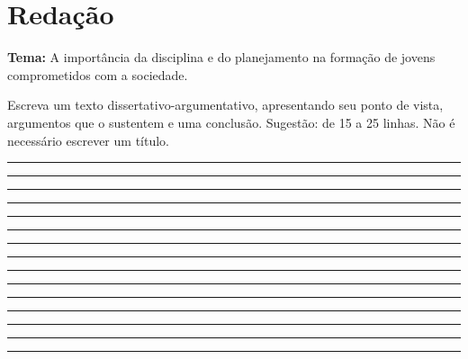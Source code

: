 \documentclass[12pt,a4paper]{article}
\begin{document}
\newpage
\section*{Redação}
\noindent\textbf{Tema:} A importância da disciplina e do planejamento na formação de jovens comprometidos com a sociedade.

\medskip
\noindent Escreva um texto dissertativo-argumentativo, apresentando seu ponto de vista, argumentos que o sustentem e uma conclusão. Sugestão: de 15 a 25 linhas. Não é necessário escrever um título.

\vspace{0.4cm}
\noindent\rule{\textwidth}{0.3pt}\par\vspace{0.45cm}
\noindent\rule{\textwidth}{0.3pt}\par\vspace{0.5cm}
\noindent\rule{\textwidth}{0.3pt}\par\vspace{0.5cm}
\noindent\rule{\textwidth}{0.3pt}\par\vspace{0.5cm}
\noindent\rule{\textwidth}{0.3pt}\par\vspace{0.5cm}
\noindent\rule{\textwidth}{0.3pt}\par\vspace{0.5cm}
\noindent\rule{\textwidth}{0.3pt}\par\vspace{0.5cm}
\noindent\rule{\textwidth}{0.3pt}\par\vspace{0.5cm}
\noindent\rule{\textwidth}{0.3pt}\par\vspace{0.5cm}
\noindent\rule{\textwidth}{0.3pt}\par\vspace{0.5cm}
\noindent\rule{\textwidth}{0.3pt}\par\vspace{0.5cm}
\noindent\rule{\textwidth}{0.3pt}\par\vspace{0.5cm}
\noindent\rule{\textwidth}{0.3pt}\par\vspace{0.5cm}
\noindent\rule{\textwidth}{0.3pt}\par\vspace{0.5cm}
\noindent\rule{\textwidth}{0.3pt}\par\vspace{0.5cm}
\end{document}
